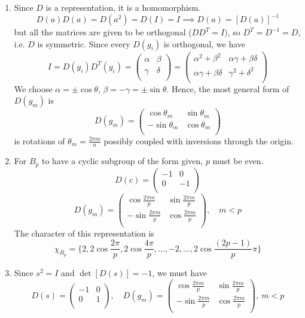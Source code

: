 \documentclass[a4paper]{article}
\begin{document}
\begin{ans}\leavevmode
\begin{enumerate}[label=(\alph*)]
\item Since $D$ is a representation, it is a homomorphism.
$$D(a)D(a)=D(a^2)=D(I)=I\implies D(a)=[D(a)]^{-1}$$
but all the matrices are given to be orthogonal ($DD^T=I)$, so $D^T=D^{-1}=D$, i.e. $D$ is symmetric. Since every $D(g_i)$ is orthogonal, we have
$$I=D(g_i)D^T(g_i)=\begin{pmatrix}\alpha&\beta\\\gamma&\delta\\\end{pmatrix}=\begin{pmatrix}\alpha^2+\beta^2&\alpha\gamma+\beta\delta\\\alpha\gamma+\beta\delta&\gamma^2+\delta^2\\\end{pmatrix}$$
We choose $\alpha=\pm\cos\theta$, $\beta=-\gamma=\pm\sin\theta$. Hence, the most general form of $D(g_m)$ is
$$D(g_m)=\begin{pmatrix}\cos\theta_m&\sin\theta_m\\-\sin\theta_m&\cos\theta_m\\\end{pmatrix}$$
is rotations of $\theta_m=\frac{2\pi m}{n}$ possibly coupled with inversions through the origin.
\item For $B_p$ to have a cyclic subgroup of the form given, $p$ must be even.
$$D(c)=\begin{pmatrix}-1&0\\0&-1\\\end{pmatrix}$$
$$D(g_m)=\begin{pmatrix}\cos\frac{2\pi m}{p}&\sin\frac{2\pi m}{p}\\-\sin\frac{2\pi m}{p}&\cos\frac{2\pi m}{p}\\\end{pmatrix},\quad m<p$$
The character of this representation is
$$\chi_{B_p}=\bigg\{2,2\cos\frac{2\pi}{p},2\cos\frac{4\pi}{p},\dots,-2,\dots,2\cos\frac{(2p-1)}{p}\pi\bigg\}$$
\newpage
\item Since $s^2=I$ and $\det[D(s)]=-1$, we must have
$$D(s)=\begin{pmatrix}-1&0\\0&1\\\end{pmatrix},\quad D(g_m)=\begin{pmatrix}\cos\frac{2\pi m}{p}&\sin\frac{2\pi m}{p}\\-\sin\frac{2\pi m}{p}&\cos\frac{2\pi m}{p}\\\end{pmatrix},~m<p$$

\end{enumerate}
\end{ans}
\end{document}
